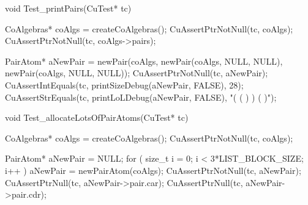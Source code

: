 void Test_printPairs(CuTest* tc) {
  CoAlgebras* coAlgs = createCoAlgebras();
  CuAssertPtrNotNull(tc, coAlgs);
  CuAssertPtrNotNull(tc, coAlgs->pairs);

  PairAtom* aNewPair = newPair(coAlgs,
                               newPair(coAlgs, NULL, NULL),
                               newPair(coAlgs, NULL, NULL));
  CuAssertPtrNotNull(tc, aNewPair);
  CuAssertIntEquals(tc, printSizeDebug(aNewPair, FALSE), 28);
  CuAssertStrEquals(tc, printLoLDebug(aNewPair, FALSE), "( ( ) ) ( )");
}

void Test_allocateLotsOfPairAtoms(CuTest* tc) {
  CoAlgebras* coAlgs = createCoAlgebras();
  CuAssertPtrNotNull(tc, coAlgs);

  PairAtom* aNewPair = NULL;
  for ( size_t i = 0; i < 3*LIST_BLOCK_SIZE; i++ ) {
    aNewPair = newPairAtom(coAlgs);
  }
  CuAssertPtrNotNull(tc, aNewPair);
  CuAssertPtrNull(tc, aNewPair->pair.car);
  CuAssertPtrNull(tc, aNewPair->pair.cdr);
}

\stoptyping
